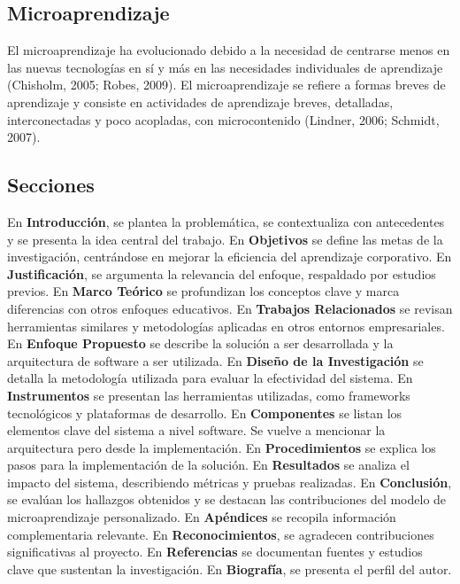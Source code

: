 \subsection{Microaprendizaje}
El microaprendizaje ha evolucionado debido a la necesidad de centrarse menos en las nuevas tecnologías en sí y más en
las necesidades individuales de aprendizaje (Chisholm, 2005; Robes, 2009). El microaprendizaje se refiere a formas breves
de aprendizaje y consiste en actividades de aprendizaje breves, detalladas, interconectadas y poco acopladas,
con microcontenido (Lindner, 2006; Schmidt, 2007).
\cite{article:microlearning_buchem}

\subsection{Secciones}

En \textbf{Introducción}, se plantea la problemática, se contextualiza con antecedentes y se presenta la idea central del trabajo.
En \textbf{Objetivos} se define las metas de la investigación, centrándose en mejorar la eficiencia del aprendizaje corporativo.
En \textbf{Justificación}, se argumenta la relevancia del enfoque, respaldado por estudios previos.
En \textbf{Marco Teórico} se profundizan los conceptos clave y marca diferencias con otros enfoques educativos.
En \textbf{Trabajos Relacionados} se revisan herramientas similares y metodologías aplicadas en otros entornos empresariales.
En \textbf{Enfoque Propuesto} se describe la solución a ser desarrollada y la arquitectura de software a ser utilizada.
En \textbf{Diseño de la Investigación} se detalla la metodología utilizada para evaluar la efectividad del sistema.
En \textbf{Instrumentos} se presentan las herramientas utilizadas, como frameworks tecnológicos y plataformas de desarrollo.
En \textbf{Componentes} se listan los elementos clave del sistema a nivel software. Se vuelve a mencionar la arquitectura pero desde la implementación.
En \textbf{Procedimientos} se explica los pasos para la implementación de la solución.
En \textbf{Resultados} se analiza el impacto del sistema, describiendo métricas y pruebas realizadas.
En \textbf{Conclusión}, se evalúan los hallazgos obtenidos y se destacan las contribuciones del modelo de microaprendizaje personalizado.
En \textbf{Apéndices} se recopila información complementaria relevante.
En \textbf{Reconocimientos}, se agradecen contribuciones significativas al proyecto.
En \textbf{Referencias} se documentan fuentes y estudios clave que sustentan la investigación.
En \textbf{Biografía}, se presenta el perfil del autor.
